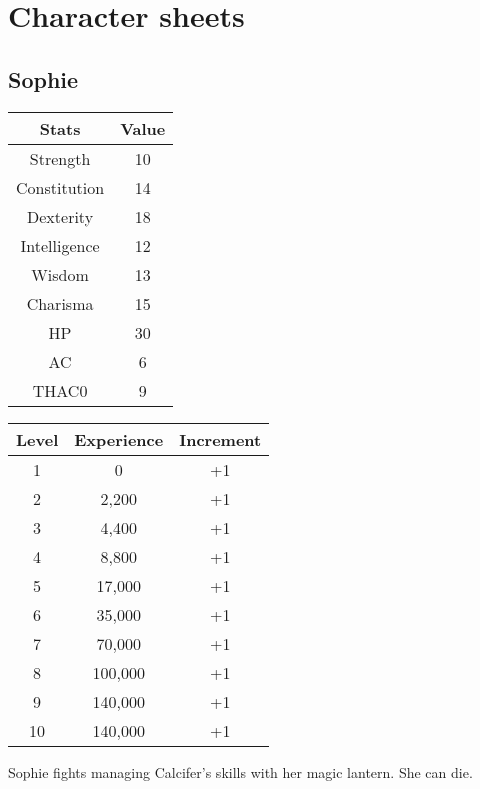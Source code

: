 \section{Character sheets}
\subsection{Sophie}
\begin{table}[H]
\begin{tabular}{|c|c|}
\hline
\rowcolor[HTML]{C0C0C0} 
\textbf{Stats} & \textbf{Value} \\ \hline
Strength & 10 \\ \hline
Constitution & 14  \\ \hline
Dexterity & 18  \\ \hline
Intelligence & 12  \\ \hline
Wisdom & 13  \\ \hline
Charisma & 15  \\ \hline
HP & 30  \\ \hline
AC & 6  \\ \hline
THAC0 & 9  \\ \hline
\end{tabular}
\quad
\begin{tabular}{|c|c|c|}
\hline
\rowcolor[HTML]{C0C0C0} 
\textbf{Level} & \textbf{Experience} & \textbf{Increment} \\ \hline
1 & 0 & +1\\ \hline
2 & 2,200 & +1\\ \hline
3 & 4,400 & +1\\ \hline
4 & 8,800 & +1 \\ \hline
5 & 17,000 & +1\\ \hline
6 & 35,000 & +1\\ \hline
7 & 70,000 & +1\\ \hline
8 & 100,000 & +1\\ \hline
9 & 140,000 & +1\\ \hline
10 & 140,000 & +1\\ \hline
\end{tabular}
\end{table}
Sophie fights managing Calcifer's skills with her magic lantern. She can die.
